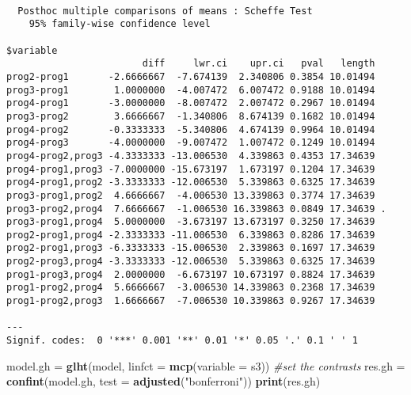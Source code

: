 \documentclass[]{article}
\newenvironment{Shaded}{\begin{snugshade}}{\end{snugshade}}
\newcommand{\KeywordTok}[1]{\textcolor[rgb]{0.13,0.29,0.53}{\textbf{#1}}}
\newcommand{\DataTypeTok}[1]{\textcolor[rgb]{0.13,0.29,0.53}{#1}}
\newcommand{\StringTok}[1]{\textcolor[rgb]{0.31,0.60,0.02}{#1}}
\newcommand{\CommentTok}[1]{\textcolor[rgb]{0.56,0.35,0.01}{\textit{#1}}}
\newcommand{\NormalTok}[1]{#1}
\begin{document}
\begin{verbatim}

  Posthoc multiple comparisons of means : Scheffe Test 
    95% family-wise confidence level

$variable
                        diff     lwr.ci    upr.ci   pval   length    
prog2-prog1       -2.6666667  -7.674139  2.340806 0.3854 10.01494    
prog3-prog1        1.0000000  -4.007472  6.007472 0.9188 10.01494    
prog4-prog1       -3.0000000  -8.007472  2.007472 0.2967 10.01494    
prog3-prog2        3.6666667  -1.340806  8.674139 0.1682 10.01494    
prog4-prog2       -0.3333333  -5.340806  4.674139 0.9964 10.01494    
prog4-prog3       -4.0000000  -9.007472  1.007472 0.1249 10.01494    
prog4-prog2,prog3 -4.3333333 -13.006530  4.339863 0.4353 17.34639    
prog4-prog1,prog3 -7.0000000 -15.673197  1.673197 0.1204 17.34639    
prog4-prog1,prog2 -3.3333333 -12.006530  5.339863 0.6325 17.34639    
prog3-prog1,prog2  4.6666667  -4.006530 13.339863 0.3774 17.34639    
prog3-prog2,prog4  7.6666667  -1.006530 16.339863 0.0849 17.34639 .  
prog3-prog1,prog4  5.0000000  -3.673197 13.673197 0.3250 17.34639    
prog2-prog1,prog4 -2.3333333 -11.006530  6.339863 0.8286 17.34639    
prog2-prog1,prog3 -6.3333333 -15.006530  2.339863 0.1697 17.34639    
prog2-prog3,prog4 -3.3333333 -12.006530  5.339863 0.6325 17.34639    
prog1-prog3,prog4  2.0000000  -6.673197 10.673197 0.8824 17.34639    
prog1-prog2,prog4  5.6666667  -3.006530 14.339863 0.2368 17.34639    
prog1-prog2,prog3  1.6666667  -7.006530 10.339863 0.9267 17.34639    

---
Signif. codes:  0 '***' 0.001 '**' 0.01 '*' 0.05 '.' 0.1 ' ' 1
\end{verbatim}

\begin{Shaded}
\begin{Highlighting}[]
\NormalTok{model.gh =}\StringTok{ }\KeywordTok{glht}\NormalTok{(model, }\DataTypeTok{linfct =} \KeywordTok{mcp}\NormalTok{(}\DataTypeTok{variable =}\NormalTok{ s3))  }\CommentTok{#set the contrasts}
\NormalTok{res.gh =}\StringTok{ }\KeywordTok{confint}\NormalTok{(model.gh, }\DataTypeTok{test =} \KeywordTok{adjusted}\NormalTok{(}\StringTok{"bonferroni"}\NormalTok{))}
\KeywordTok{print}\NormalTok{(res.gh)}
\end{Highlighting}
\end{Shaded}
\end{document}
